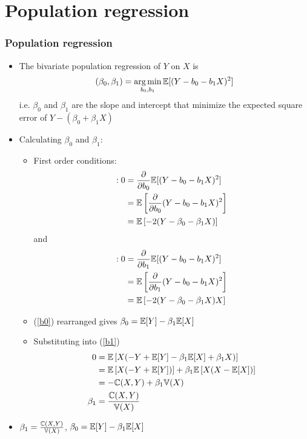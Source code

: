 \section{Population regression} 
\begin{frame}[allowframebreaks]\frametitle{Population regression}
  \begin{itemize}
  \item The bivariate \alert{population regression} of $Y$ on $X$ is 
    \[ (\beta_0, \beta_1) = \argmin_{b_0,b_1} \Er[(Y - b_0 - b_1
    X)^2 ] \] 
    i.e. $\beta_0$ and $\beta_1$ are the slope and intercept that
    minimize the expected square error of $Y - (\beta_0 + \beta_1 X)$ 
  \item Calculating $\beta_0$ and $\beta_1$:
    \begin{itemize}
    \item First order conditions:
      \begin{align}
        [b_0]: 0 & =  \frac{\partial}{\partial b_0} \Er[(Y - b_0 - b_1
        X)^2 ] \notag \\
         &=  \Er\left[\frac{\partial}{\partial b_0}  (Y - b_0 - b_1 X)^2 \right]
         \notag \\
        &=  \Er\left[ -2(Y - \beta_0 - \beta_1 X) \right] \label{b0}
      \end{align}
      and
      \begin{align}
        [b_1]:  0 &=  \frac{\partial}{\partial b_1} \Er[(Y - b_0 - b_1
        X)^2 ] \notag \\
         &=  \Er\left[\frac{\partial}{\partial b_1}  (Y - b_0 - b_1 X)^2 \right]
        \notag \\
        &=  \Er\left[ -2(Y - \beta_0 - \beta_1 X)X \right] \label{b1}
      \end{align}
    \item (\ref{b0}) rearranged gives $\beta_0 = \mathbb{E}[Y] - \beta_1
      \mathbb{E}[X]$
    \item Substituting into (\ref{b1})
      \begin{align*}
        0 &=  \mathbb{E}\left[ X(-Y + \mathbb{E}[Y] - \beta_1 \mathbb{E}[X] + \beta_1 X) \right] \\
        &=  \mathbb{E}\left[X(-Y + \mathbb{E}[Y])\right] + \beta_1\mathbb{E}\left[X(X -
          \mathbb{E}[X])\right] \\
        &=  -\mathbb{C}(X,Y) + \beta_1 \mathbb{V}(X) \\
        \beta_1 &=  \frac{\mathbb{C}(X,Y)}{\mathbb{V}(X)}
      \end{align*}
    \end{itemize}
  \item \alert{$\beta_1 = \frac{\mathbb{C}(X,Y)}{\mathbb{V}(X)}$, $\beta_0 = \mathbb{E}[Y] - \beta_1
      \mathbb{E}[X]$}
  \end{itemize}
\end{frame}

